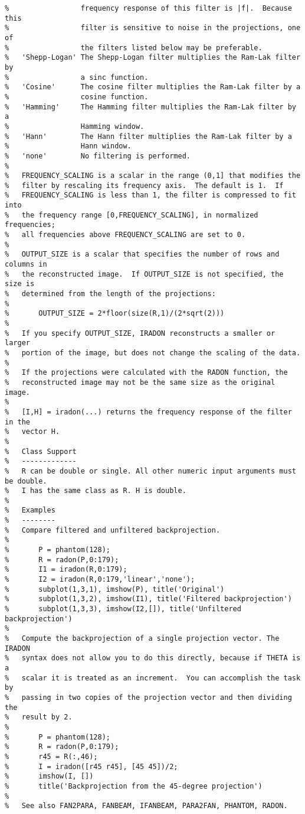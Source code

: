 \begin{lstlisting}
%                 frequency response of this filter is |f|.  Because this
%                 filter is sensitive to noise in the projections, one of
%                 the filters listed below may be preferable.
%   'Shepp-Logan' The Shepp-Logan filter multiplies the Ram-Lak filter by
%                 a sinc function.
%   'Cosine'      The cosine filter multiplies the Ram-Lak filter by a
%                 cosine function.
%   'Hamming'     The Hamming filter multiplies the Ram-Lak filter by a
%                 Hamming window.
%   'Hann'        The Hann filter multiplies the Ram-Lak filter by a
%                 Hann window.
%   'none'        No filtering is performed.
%
%   FREQUENCY_SCALING is a scalar in the range (0,1] that modifies the
%   filter by rescaling its frequency axis.  The default is 1.  If
%   FREQUENCY_SCALING is less than 1, the filter is compressed to fit into
%   the frequency range [0,FREQUENCY_SCALING], in normalized frequencies;
%   all frequencies above FREQUENCY_SCALING are set to 0.
%
%   OUTPUT_SIZE is a scalar that specifies the number of rows and columns in
%   the reconstructed image.  If OUTPUT_SIZE is not specified, the size is
%   determined from the length of the projections:
%
%       OUTPUT_SIZE = 2*floor(size(R,1)/(2*sqrt(2)))
%
%   If you specify OUTPUT_SIZE, IRADON reconstructs a smaller or larger
%   portion of the image, but does not change the scaling of the data.
%
%   If the projections were calculated with the RADON function, the
%   reconstructed image may not be the same size as the original image.
%
%   [I,H] = iradon(...) returns the frequency response of the filter in the
%   vector H.
%
%   Class Support
%   -------------
%   R can be double or single. All other numeric input arguments must be double.
%   I has the same class as R. H is double.
%
%   Examples
%   --------
%   Compare filtered and unfiltered backprojection.
%
%       P = phantom(128);
%       R = radon(P,0:179);
%       I1 = iradon(R,0:179);
%       I2 = iradon(R,0:179,'linear','none');
%       subplot(1,3,1), imshow(P), title('Original')
%       subplot(1,3,2), imshow(I1), title('Filtered backprojection')
%       subplot(1,3,3), imshow(I2,[]), title('Unfiltered backprojection')
%
%   Compute the backprojection of a single projection vector. The IRADON
%   syntax does not allow you to do this directly, because if THETA is a
%   scalar it is treated as an increment.  You can accomplish the task by
%   passing in two copies of the projection vector and then dividing the
%   result by 2.
%
%       P = phantom(128);
%       R = radon(P,0:179);
%       r45 = R(:,46);
%       I = iradon([r45 r45], [45 45])/2;
%       imshow(I, [])
%       title('Backprojection from the 45-degree projection')
%
%   See also FAN2PARA, FANBEAM, IFANBEAM, PARA2FAN, PHANTOM, RADON.


\end{lstlisting}

